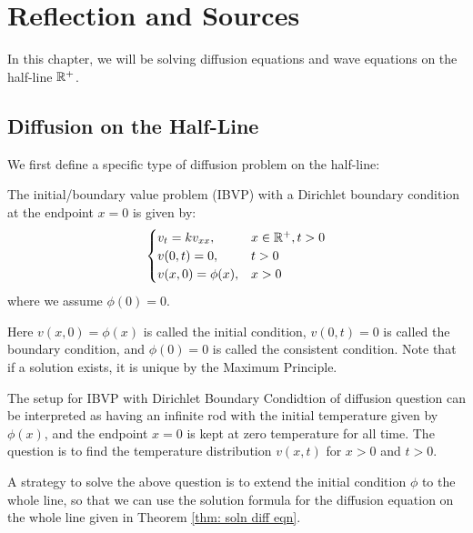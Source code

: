 \chapter{Reflection and Sources}

In this chapter, we will be solving diffusion equations and wave equations on the half-line ${\mathbb R}^+$. 
\section{Diffusion on the Half-Line}

We first define a specific type of diffusion problem on the half-line:

\medskip 

\begin{defn} 
    The initial/boundary value problem (IBVP) with a Dirichlet boundary condition at the endpoint $x=0$ is given by:
    \begin{align*}
        \begin{cases}
            v_t = k v_{xx}, & x\in{\mathbb R}^+, t > 0 \\
            v(0,t) = 0, & t > 0 \\
            v(x,0) = \phi(x), & x > 0
        \end{cases}
    \end{align*}
    where we assume $\phi(0)=0$.
\end{defn}

Here $v(x,0)=\phi(x)$ is called the initial condition, $v(0,t)=0$ is called the boundary condition, and $\phi(0)=0$ is called the consistent condition. Note that if a solution exists, it is unique by the Maximum Principle.

\medskip 

\begin{re} 
    The setup for IBVP with Dirichlet Boundary Condidtion of diffusion question can be interpreted as having an infinite rod with the initial temperature given by $\phi(x)$, and the endpoint $x=0$ is kept at zero temperature for all time. The question is to find the temperature distribution $v(x,t)$ for $x > 0$ and $t > 0$. 
\end{re}

A strategy to solve the above question is to extend the initial condition $\phi$ to the whole line, so that we can use the solution formula for the diffusion equation on the whole line given in Theorem \ref{thm: soln diff eqn}.

